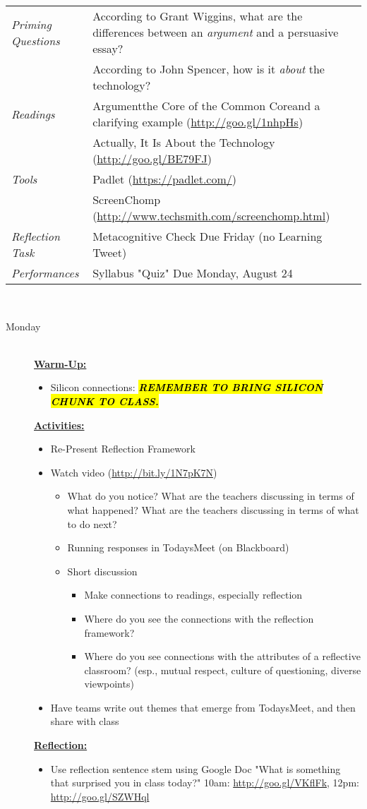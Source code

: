 \documentclass{tufte-handout}
\newcommand{\tabpq}{\faQuestionCircle\medspace\textit{Priming Questions}}
\newcommand{\tabread}{\faBook\medspace\textit{Readings}}
\newcommand{\tabperformance}{\faTasks\medspace\textit{Performances}}
\newcommand{\tabtools}{\faWrench\medspace\textit{Tools}}
\newcommand{\tabcheck}{\faLightbulbO\medspace\textit{Reflection Task} & Metacognitive Check Due Friday (no Learning Tweet) \\}
\newenvironment{tabsched}
	{\small
	\begin{tabular}{p{1.5in}p{4.5in}}
	\toprule}
	{\bottomrule
	\end{tabular}
	\normalsize\\}
\newcommand{\listmon}{\item[Monday] \hfill \\}
\newenvironment{daywu}
	{\textbf{\underline{Warm-Up:}} \hfill \\
	\begin{itemize}}
	{\end{itemize}}
\newenvironment{dayact}
	{\textbf{\underline{Activities:}} \hfill \\
	\begin{itemize}}
	{\end{itemize}}
\newenvironment{dayref}
	{\textbf{\underline{Reflection:}} \hfill \\
	\begin{itemize}}
	{\end{itemize}}
\newenvironment{weeksched}
	{\noindent
	\begin{description}}
	{\end{description}
	\newpage}
\begin{document}
\begin{fullwidth}
\begin{tabsched}
	\tabpq & According to Grant Wiggins, what are the differences between an \emph{argument} and a persuasive essay? \\
	& According to John Spencer, how is it \emph{about} the technology? \\
	\midrule
	\tabread & Argument\textemdash{}the Core of the Common Core\textemdash{}and a clarifying example (\url{http://goo.gl/1nhpHs}) \\
	& Actually, It Is About the Technology (\url{http://goo.gl/BE79FJ}) \\
	\midrule
	\tabtools & Padlet (\url{https://padlet.com/}) \\
	& ScreenChomp (\url{http://www.techsmith.com/screenchomp.html}) \\
	\midrule
	\tabcheck
	\midrule
	\tabperformance & Syllabus "Quiz" Due Monday, August 24 \\
\end{tabsched}
\begin{weeksched}

\listmon
\begin{daywu}
	\item Silicon connections: \textbf{\emph{\hl{REMEMBER TO BRING SILICON CHUNK TO CLASS.}}}
\end{daywu}
\begin{dayact}
	\item Re-Present Reflection Framework
	\item Watch video (\url{http://bit.ly/1N7pK7N})
	\begin{itemize}
		\item What do you notice? What are the teachers discussing in terms of what happened? What are the teachers discussing in terms of what to do next?
		\item Running responses in TodaysMeet (on Blackboard)
		\item Short discussion
		\begin{itemize}
			\item Make connections to readings, especially reflection
			\item Where do you see the connections with the reflection framework?
			\item Where do you see connections with the attributes of a reflective classroom? (esp., mutual respect, culture of questioning, diverse viewpoints)
		\end{itemize}
	\end{itemize}
	\item Have teams write out themes that emerge from TodaysMeet, and then share with class
\end{dayact}
\begin{dayref}
	\item Use reflection sentence stem using Google Doc "What is something that surprised you in class today?" 10am: \url{http://goo.gl/VKflFk}, 12pm: \url{http://goo.gl/SZWHql}
\end{dayref}


\end{weeksched}
\end{fullwidth}
\end{document}
